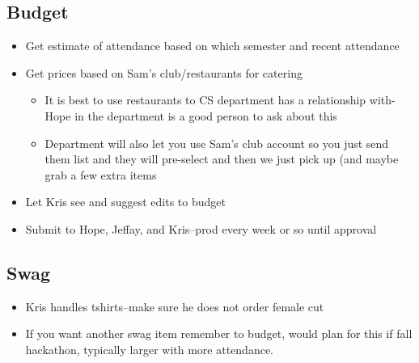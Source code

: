 \documentclass[a4paper]{article}
\begin{document}
\subsection{Budget}
\begin{itemize}
\item Get estimate of attendance based on which semester and recent attendance
\item Get prices based on Sam’s club/restaurants for catering
\begin{itemize}
\item It is best to use restaurants to CS department has a relationship with-Hope in the department is a good person to ask about this 
\item Department will also let you use Sam’s club account so you just send them list and they will pre-select and then we just pick up (and maybe grab a few extra items 
\end{itemize}
\item Let Kris see and suggest edits to budget
\item Submit to Hope, Jeffay, and Kris--prod every week or so until approval 
\end{itemize}
\subsection{Swag}
\begin{itemize}
\item Kris handles tshirts--make sure he does not order female cut
\item If you want another swag item remember to budget, would plan for this if fall hackathon, typically larger with more attendance. 
\end{itemize}
\end{document}
